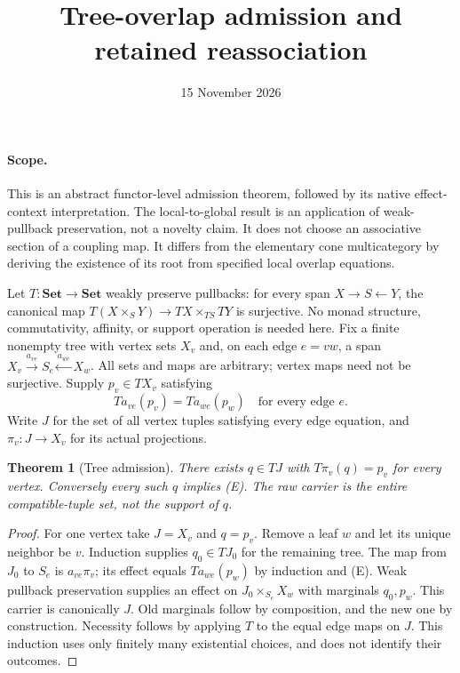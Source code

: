 \documentclass[11pt]{article}
\title{Tree-overlap admission and retained reassociation}\date{15 November 2026}
\newtheorem{theorem}{Theorem}\newtheorem{proposition}{Proposition}
\begin{document}
\maketitle
\paragraph{Scope.} This is an abstract functor-level admission theorem, followed by its native effect-context interpretation. The local-to-global result is an application of weak-pullback preservation, not a novelty claim. It does not choose an associative section of a coupling map. It differs from the elementary cone multicategory by deriving the existence of its root from specified local overlap equations.

Let $T:\mathbf{Set}\to\mathbf{Set}$ weakly preserve pullbacks: for every span $X\to S\leftarrow Y$, the canonical map $T(X\times_S Y)\to TX\times_{TS}TY$ is surjective. No monad structure, commutativity, affinity, or support operation is needed here. Fix a finite nonempty tree with vertex sets $X_v$ and, on each edge $e=vw$, a span $X_v\xrightarrow{a_{ve}}S_e\xleftarrow{a_{we}}X_w$. All sets and maps are arbitrary; vertex maps need not be surjective. Supply $p_v\in TX_v$ satisfying
\[
 T a_{ve}(p_v)=T a_{we}(p_w)\quad\text{for every edge }e.
\tag{E}
\]
Write $J$ for the set of all vertex tuples satisfying every edge equation, and $\pi_v:J\to X_v$ for its actual projections.

\begin{theorem}[Tree admission]
There exists $q\in TJ$ with $T\pi_v(q)=p_v$ for every vertex. Conversely every such $q$ implies (E). The raw carrier is the entire compatible-tuple set, not the support of $q$.
\end{theorem}
\begin{proof}
For one vertex take $J=X_v$ and $q=p_v$. Remove a leaf $w$ and let its unique neighbor be $v$. Induction supplies $q_0\in TJ_0$ for the remaining tree. The map from $J_0$ to $S_e$ is $a_{ve}\pi_v$; its effect equals $T a_{we}(p_w)$ by induction and (E). Weak pullback preservation supplies an effect on $J_0\times_{S_e}X_w$ with marginals $q_0,p_w$. This carrier is canonically $J$. Old marginals follow by composition, and the new one by construction. Necessity follows by applying $T$ to the equal edge maps on $J$. This induction uses only finitely many existential choices, and does not identify their outcomes.
\end{proof}
\end{document}
